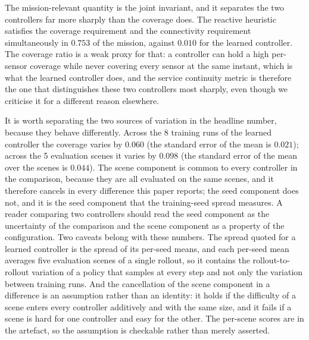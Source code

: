 The mission-relevant quantity is the joint invariant, and it separates
the two controllers far more sharply than the coverage does.  The
reactive heuristic satisfies the coverage requirement and the connectivity requirement simultaneously in $0.753$ of the
mission, against $0.010$ for the learned controller.  The
coverage ratio is a weak proxy for that: a controller can hold a high
per-sensor coverage while never covering every sensor at the same
instant, which is what the learned controller does, and the service
continuity metric is therefore the one that distinguishes these two
controllers most sharply, even though we criticise it for a different
reason elsewhere.

It is worth separating the two sources of variation in the headline
number, because they behave differently.  Across the 8
training runs of the learned controller the coverage varies by $0.060$
(the standard error of the mean is $0.021$); across the
5 evaluation scenes it varies by $0.098$ (the
standard error of the mean over the scenes is $0.044$).  The
scene component is common to every controller in the comparison, because
they are all evaluated on the same scenes, and it therefore cancels in
every difference this paper reports; the seed component does not, and it
is the seed component that the training-seed spread measures.  A reader
comparing two controllers should read the seed component as the
uncertainty of the comparison and the scene component as a property of the
configuration.  Two caveats belong with these numbers.  The spread
quoted for a learned controller is the spread of its per-seed means,
and each per-seed mean averages five evaluation scenes of a single
rollout, so it contains the rollout-to-rollout variation of a policy
that samples at every step and not only the variation between training
runs.  And the cancellation of the scene component in a difference is an
assumption rather than an identity: it holds if the difficulty of a
scene enters every controller additively and with the same size, and
it fails if a scene is hard for one controller and easy for the other.
The per-scene scores are in the artefact, so the assumption is
checkable rather than merely asserted.

